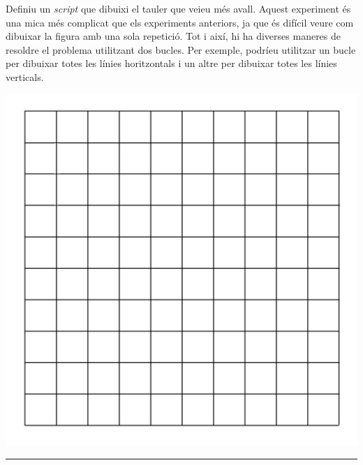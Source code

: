 \begin{center}
\colorbox{black}{}
\end{center}
{\small
\noindent
Definiu un \emph{script} que dibuixi el tauler que veieu més avall. Aquest experiment és una mica més complicat que els experiments anteriors, ja que és difícil veure com dibuixar la figura amb una sola repetició. Tot i així, hi ha diverses maneres de resoldre el problema utilitzant dos bucles. Per exemple, podríeu utilitzar un bucle per dibuixar totes les línies horitzontals i un altre per dibuixar totes les línies verticals.}
\begin{center}
\includegraphics[scale=0.3]{Imatges/figuraE10-6.png}
\end{center}
\noindent
\rule{\textwidth}{3pt}

